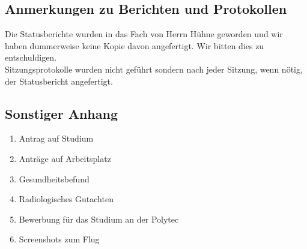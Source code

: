 \documentclass[11pt]{article}
\begin{document}
\subsection{Anmerkungen zu Berichten und Protokollen}
Die Statusberichte wurden in das Fach von Herrn Hühne geworden und wir haben dummerweise keine Kopie davon angefertigt. Wir bitten dies zu entschuldigen.
\\
Sitzungsprotokolle wurden nicht geführt sondern nach jeder Sitzung, wenn nötig, der Statusbericht angefertigt.

\subsection{Sonstiger Anhang}
\begin{enumerate}
\item Antrag auf Studium
\item Anträge auf Arbeitsplatz
\item Gesundheitsbefund
\item Radiologisches Gutachten
\item Bewerbung für das Studium an der Polytec
\item Screenshots zum Flug
\end{enumerate}














\end{document}

